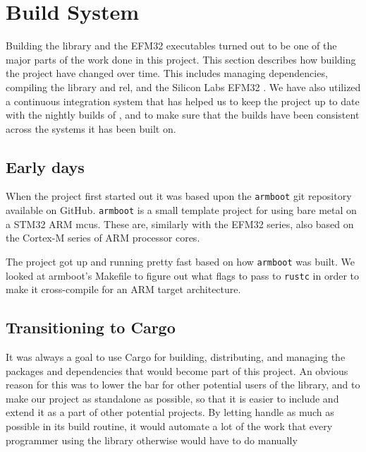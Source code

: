 \section{Build System}
\label{sec:build_system}

Building the library and the EFM32 executables turned out to be one of the major parts of the work done in this project.
This section describes how building the project have changed over time.
This includes managing dependencies, compiling the {\core} library and \gls{rel}, and the Silicon Labs EFM32 {\emlib}.
We have also utilized a continuous integration system that has helped us to keep the project up to date with the nightly builds of {\rust}, and to make sure that the builds have been consistent across the systems it has been built on.

\subsection{Early days}
\label{ssub:using_make}

When the project first started out it was based upon the \texttt{armboot} \cite{github:armboot} git repository available on GitHub.
\texttt{armboot} is a small template project for using {\rust} bare metal on a STM32 ARM \glspl{mcu}.
These are, similarly with the EFM32 series, also based on the Cortex-M series of ARM processor cores.

The project got up and running pretty fast based on how \texttt{armboot} was built.
We looked at armboot's Makefile to figure out what flags to pass to \texttt{rustc} in order to make it cross-compile for an ARM target architecture.

\subsection{Transitioning to Cargo}
\label{ssub:transitioning_to_cargo}

It was always a goal to use Cargo for building, distributing, and managing the packages and dependencies that would become part of this project.
An obvious reason for this was to lower the bar for other potential users of the library, and to make our project as standalone as possible, so that it is easier to include and extend it as a part of other potential projects.
By letting {\cargo} handle as much as possible in its build routine, it would automate a lot of the work that every programmer using the library otherwise would have to do manually

